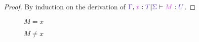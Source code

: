 \begin{proof}
  By induction on the derivation of $\seq{\ty{\Gamma},\tmty{x}{T}}{\ty{\Sigma}}{M}{U}$.
\end{proof}

\begin{figure*}
  \begin{case}{}
    \begin{subcase}{$M = x$}
      \begin{mathpar}

      \end{mathpar}
    \end{subcase}
    \begin{subcase}{$M \neq x$}
      \begin{mathpar}
      \end{mathpar}
    \end{subcase}
  \end{case}
  
  \begin{case}{}
    \begin{mathpar}
    \end{mathpar}
  \end{case}
  
  \begin{case}{}
    \begin{mathpar}
    \end{mathpar}
  \end{case}
  
  \begin{case}{}
    \begin{mathpar}
    \end{mathpar}
  \end{case}
  

\end{figure*}
